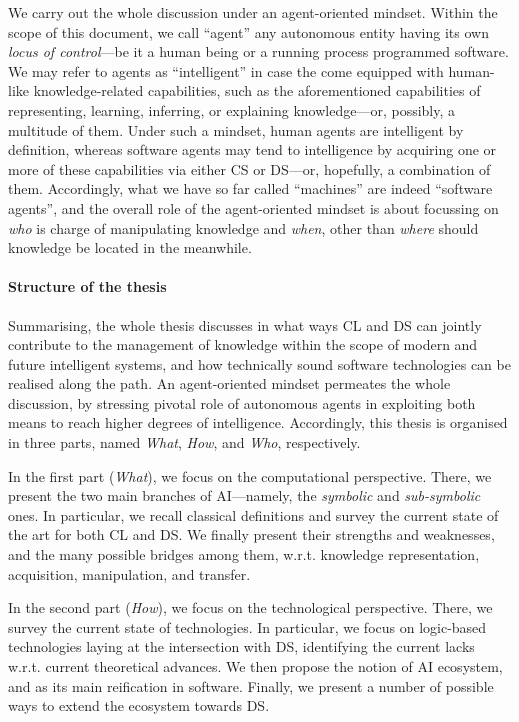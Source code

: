 \documentclass[12pt,a4paper,openright,twoside]{book}
\begin{document}
We carry out the whole discussion under an agent-oriented mindset.
%
Within the scope of this document, we call ``agent'' any autonomous entity having its own \emph{locus of control}---be it a human being or a running process programmed software.
%
We may refer to agents as ``intelligent'' in case the come equipped with human-like knowledge-related capabilities, such as the aforementioned capabilities of representing, learning, inferring, or explaining knowledge---or, possibly, a multitude of them.
%
Under such a mindset, human agents are intelligent by definition, whereas software agents may tend to intelligence by acquiring one or more of these capabilities via either CS or DS---or, hopefully, a combination of them.
%
Accordingly, what we have so far called ``machines'' are indeed ``software agents'', and the overall role of the agent-oriented mindset is about focussing on \emph{who} is charge of manipulating knowledge and \emph{when}, other than \emph{where} should knowledge be located in the meanwhile.


\paragraph{Structure of the thesis}

Summarising, the whole thesis discusses in what ways CL and DS can jointly contribute to the management of knowledge within the scope of modern and future intelligent systems, and how technically sound software technologies can be realised along the path.
%
An agent-oriented mindset permeates the whole discussion, by stressing pivotal role of autonomous agents in exploiting both means to reach higher degrees of intelligence.
%
Accordingly, this thesis is organised in three parts, named \emph{What}, \emph{How}, and \emph{Who}, respectively.

In the first part (\emph{What}), we focus on the computational perspective.
%
There, we present the two main branches of AI---namely, the \emph{symbolic} and \emph{sub-symbolic} ones.
%
In particular, we recall classical definitions and survey the current state of the art for both CL and DS.
%
We finally present their strengths and weaknesses, and the many possible bridges among them, w.r.t. knowledge representation, acquisition, manipulation, and transfer.

In the second part (\emph{How}), we focus on the technological perspective.
%
There, we survey the current state of technologies.
%
In particular, we focus on logic-based technologies laying at the intersection with DS, identifying the current lacks w.r.t. current theoretical advances. 
%
We then propose the notion of AI ecosystem, and \twopkt{} as its main reification in software.
%
Finally, we present a number of possible ways to extend the \twopkt{} ecosystem towards DS.
\end{document}
